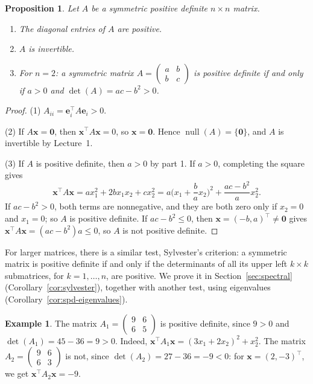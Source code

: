 \documentclass[11pt]{article}
\theoremstyle{definition}
\newtheorem{example}[definition]{Example}
\theoremstyle{plain}
\newtheorem{proposition}[definition]{Proposition}
\theoremstyle{remark}
\DeclareMathOperator{\Null}{null}
\begin{document}
\begin{proposition}\label{prop:spd-properties}
    Let $A$ be a symmetric positive definite $n \times n$ matrix.
    \begin{enumerate}
        \item The diagonal entries of $A$ are positive.
        \item $A$ is invertible.
        \item For $n = 2$: a symmetric matrix $A = \begin{pmatrix} a & b \\ b & c \end{pmatrix}$ is positive definite if and only if $a > 0$ and $\det(A) = ac - b^2 > 0$.
    \end{enumerate}
\end{proposition}

\begin{proof}
    (1) $A_{ii} = \mathbf{e}_i^\top A \mathbf{e}_i > 0$.

    (2) If $A\mathbf{x} = \mathbf{0}$, then $\mathbf{x}^\top A \mathbf{x} = 0$, so $\mathbf{x} = \mathbf{0}$. Hence $\Null(A) = \{\mathbf{0}\}$, and $A$ is invertible by Lecture~1.

    (3) If $A$ is positive definite, then $a > 0$ by part 1. If $a > 0$, completing the square gives
    \[\mathbf{x}^\top A \mathbf{x} = a x_1^2 + 2b x_1 x_2 + c x_2^2 = a \Big(x_1 + \frac{b}{a} x_2\Big)^2 + \frac{ac - b^2}{a} x_2^2.\]
    If $ac - b^2 > 0$, both terms are nonnegative, and they are both zero only if $x_2 = 0$ and $x_1 = 0$; so $A$ is positive definite. If $ac - b^2 \leq 0$, then $\mathbf{x} = (-b, a)^\top \neq \mathbf{0}$ gives $\mathbf{x}^\top A \mathbf{x} = (ac - b^2) a \leq 0$, so $A$ is not positive definite.
\end{proof}

For larger matrices, there is a similar test, Sylvester's criterion: a symmetric matrix is positive definite if and only if the determinants of all its upper left $k \times k$ submatrices, for $k = 1, \ldots, n$, are positive. We prove it in Section~\ref{sec:spectral} (Corollary~\ref{cor:sylvester}), together with another test, using eigenvalues (Corollary~\ref{cor:spd-eigenvalues}).

\begin{example}
    The matrix $A_1 = \begin{pmatrix} 9 & 6 \\ 6 & 5 \end{pmatrix}$ is positive definite, since $9 > 0$ and $\det(A_1) = 45 - 36 = 9 > 0$. Indeed, $\mathbf{x}^\top A_1 \mathbf{x} = (3x_1 + 2x_2)^2 + x_2^2$. The matrix $A_2 = \begin{pmatrix} 9 & 6 \\ 6 & 3 \end{pmatrix}$ is not, since $\det(A_2) = 27 - 36 = -9 < 0$: for $\mathbf{x} = (2, -3)^\top$, we get $\mathbf{x}^\top A_2 \mathbf{x} = -9$.
\end{example}
\end{document}
